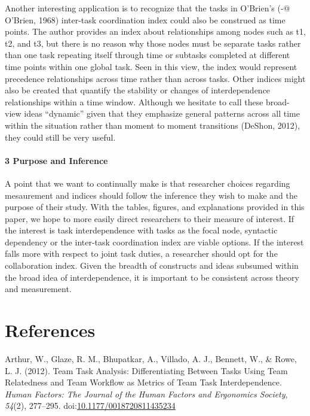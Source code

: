 \documentclass[english,,man]{apa6}
\let\oldparagraph\paragraph
\renewcommand{\paragraph}[1]{\oldparagraph{#1}\mbox{}}
\theoremstyle{definition}
\theoremstyle{definition}
\theoremstyle{definition}
\theoremstyle{remark}
\begin{document}
Another interesting application is to recognize that the tasks in
O'Brien's (-@ O'Brien, 1968) inter-task coordination index could also be
construed as time points. The author provides an index about
relationships among nodes such as t1, t2, and t3, but there is no reason
why those nodes must be separate tasks rather than one task repeating
itself through time or subtasks completed at different time points
within one global task. Seen in this view, the index would represent
precedence relationships across time rather than across tasks. Other
indices might also be created that quantify the stability or changes of
interdependence relationships within a time window. Although we hesitate
to call these broad-view ideas \enquote{dynamic} given that they
emphasize general patterns across all time within the situation rather
than moment to moment transitions (DeShon, 2012), they could still be
very useful.

\hypertarget{purpose-and-inference-1}{%
\paragraph{3 Purpose and Inference}\label{purpose-and-inference-1}}

A point that we want to continually make is that researcher choices
regarding mesaurement and indices should follow the inference they wish
to make and the purpose of their study. With the tables, figures, and
explanations provided in this paper, we hope to more easily direct
researchers to their measure of interest. If the interest is task
interdependence with tasks as the focal node, syntactic dependency or
the inter-task coordination index are viable options. If the interest
falls more with respect to joint task duties, a researcher should opt
for the collaboration index. Given the breadth of constructs and ideas
subsumed within the broad idea of interdependence, it is important to be
consistent across theory and measurement.

\newpage

\hypertarget{references}{%
\section{References}\label{references}}

\setlength{\parindent}{-0.5in}
\setlength{\leftskip}{0.5in}

\hypertarget{refs}{}
\leavevmode\hypertarget{ref-arthur_team_2012}{}%
Arthur, W., Glaze, R. M., Bhupatkar, A., Villado, A. J., Bennett, W., \&
Rowe, L. J. (2012). Team Task Analysis: Differentiating Between Tasks
Using Team Relatedness and Team Workflow as Metrics of Team Task
Interdependence. \emph{Human Factors: The Journal of the Human Factors
and Ergonomics Society}, \emph{54}(2), 277--295.
doi:\href{https://doi.org/10.1177/0018720811435234}{10.1177/0018720811435234}
\end{document}
